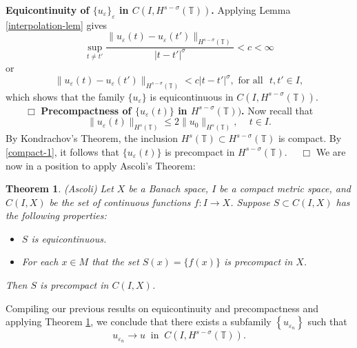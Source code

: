 \documentclass[12pt,reqno]{amsart}
\newcommand{\nin}{\noindent}
\newcommand{\ci}{\mathbb{T}}
\newcommand{\ee}{\varepsilon}
\theoremstyle{plain}  %
\newtheorem{theorem}{Theorem}
\theoremstyle{definition}
\begin{document}
\begin{appendices}

		\vskip0.1in
		\nin
		{\bf  Equicontinuity of $\{u_\ee\}_\ee$  in
		$C(I,H^{s-\sigma}(\ci))$.} Applying  Lemma \ref{interpolation-lem} gives 
		\begin{equation}
			\label{equic-1}
			\sup_{t \neq t'} \frac { \|u_\ee(t) - u_\ee(t') \|_{H^{s -
			\sigma}(\ci)}}{|t - t'|^\sigma} < c<\infty
		\end{equation}
		or
		\begin{equation}
			\label{equic-2}
			\|u_\ee(t) - u_\ee(t') \|_{H^{s - \sigma}(\ci)}< c|t - t'|^\sigma, 
			\text{ for all }  \,\,  t, t'\in I,
		\end{equation}
		which shows that  the family  $\{u_\ee\}$ is equicontinuous in 
		$C(I, H^{s-\sigma}(\ci))$. $\qquad \Box$
		\vskip0.1in
		\nin
		{\bf Precompactness of $\{u_\ee(t)\}$ in $H^{s-\sigma}(\ci))$.}
		Now recall that
		\begin{equation}
			\label{compact-1}
			\|u_\ee(t)\|_{H^{s}(\ci)}
			\le
			2 \|u_0 \|_{H^s(\ci)}, \,
			\quad
			t\in I.
		\end{equation}
		By Kondrachov's Theorem, the inclusion $H^s(\ci) \subset H^{s-
		\sigma }(\ci)$ is compact. By \eqref{compact-1},
		it follows that $\{u_\ee(t)\}$ is precompact in $H^{s-\sigma}(\ci)$.
		$\quad \Box$
		\vskip0.1in
		We are now in a position to apply Ascoli's Theorem: 
		\begin{theorem}
			\label{Ascoli}
			(Ascoli)  Let $X$ be a Banach space, $I$ be a compact metric space,
			and $C(I,X)$  be the set of continuous functions $f: I\longrightarrow X$.
			Suppose $S \subset C(I,X)$  has the following properties:
			\begin{itemize}
				\item[(1)]   $S$ is  equicontinuous.
				\item[(2)]  For each $x \in M$ that the set $S(x) = \{f(x)\}$  is  precompact in $X$.
			\end{itemize} 
			Then $S$  is  precompact  in  $C(I,X)$.
		\end{theorem}
		Compiling our previous results on equicontinuity and precompactness
		and applying Theorem \ref{Ascoli}, we
		conclude that there exists a subfamily $\left\{ u_{\ee_n} \right\}$
		such that
		\begin{equation}
			\label{strong-conv-of-u_ep}
			u_{\ee_n} \to u \; \; \text{in} \; \; C(I, H^{s-\sigma}(\ci)).
		\end{equation}


\end{appendices}
\end{document}
